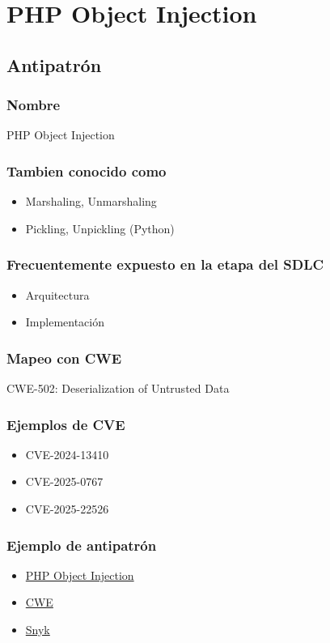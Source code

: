 \chapter{PHP Object Injection}
\section{Antipatrón}
\subsection*{Nombre}
PHP Object Injection
\subsection*{Tambien conocido como}
\begin{itemize}
    \item Marshaling, Unmarshaling
    \item Pickling, Unpickling (Python)
\end{itemize}
\subsection*{Frecuentemente expuesto en la etapa del SDLC}
\begin{itemize}
    \item Arquitectura
    \item Implementación
\end{itemize}
\subsection*{Mapeo con CWE}
CWE-502: Deserialization of Untrusted Data
\subsection*{Ejemplos de CVE}
\begin{itemize}
    \item CVE-2024-13410
    \item CVE-2025-0767
    \item CVE-2025-22526
\end{itemize}

\subsection*{Ejemplo de antipatrón}
\begin{itemize}
    \item \href{https://patchstack.com/academy/wordpress/vulnerabilities/php-object-injection/}{PHP Object Injection}
    \item \href{https://cwe.mitre.org/data/definitions/502.html}{CWE}
    \item \href{https://learn.snyk.io/lesson/object-injection/?ecosystem=php}{Snyk}
\end{itemize}
